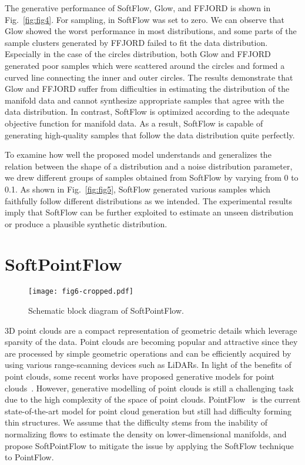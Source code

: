 \documentclass{article}
\begin{document}
The generative performance of SoftFlow, Glow, and FFJORD is shown in Fig.~\ref{fig:fig4}. For sampling,  in SoftFlow was set to zero. We can observe that Glow showed the worst performance in most distributions, and some parts of the sample clusters generated by FFJORD failed to fit the data distribution. Especially in the case of the circles distribution, both Glow and FFJORD generated poor samples which were scattered around the circles and formed a curved line connecting the inner and outer circles.
The results demonstrate that Glow and FFJORD suffer from difficulties in estimating the distribution of the manifold data and cannot synthesize appropriate samples that agree with the data distribution. In contrast, SoftFlow is optimized according to the adequate objective function for manifold data. As a result, SoftFlow is capable of generating high-quality samples that follow the data distribution quite perfectly. 

To examine how well the proposed model understands and generalizes the relation between the shape of a distribution and a noise distribution parameter, we drew different groups of samples obtained from SoftFlow by varying  from 0 to 0.1. As shown in Fig.~\ref{fig:fig5}, SoftFlow generated various samples which faithfully follow different distributions as we intended. The experimental results imply that SoftFlow can be further exploited to estimate an unseen distribution or produce a plausible synthetic distribution.

 \section{SoftPointFlow}
 \begin{figure}[t]
	\centering
	\texttt{[image: fig6-cropped.pdf]}
    \caption{Schematic block diagram of SoftPointFlow.}
	\label{fig:fig6}
\end{figure}
3D point clouds are a compact representation of geometric details which leverage sparsity of the data. Point clouds are becoming popular and attractive since they are processed by simple geometric operations and can be efficiently acquired by using various range-scanning devices such as LiDARs. In light of the benefits of point clouds, some recent works have proposed generative models for point clouds~\citep{yang2019pointflow,achlioptas2017learning,groueix2018papier}. However, generative modelling of point clouds is still a challenging task due to the high complexity of the space of point clouds. PointFlow~\citep{yang2019pointflow} is the current state-of-the-art model for point cloud generation but still had difficulty forming thin structures. We assume that the difficulty stems from the inability of normalizing flows to estimate the density on lower-dimensional manifolds, and propose SoftPointFlow to mitigate the issue by applying the SoftFlow technique to PointFlow.
\end{document}
